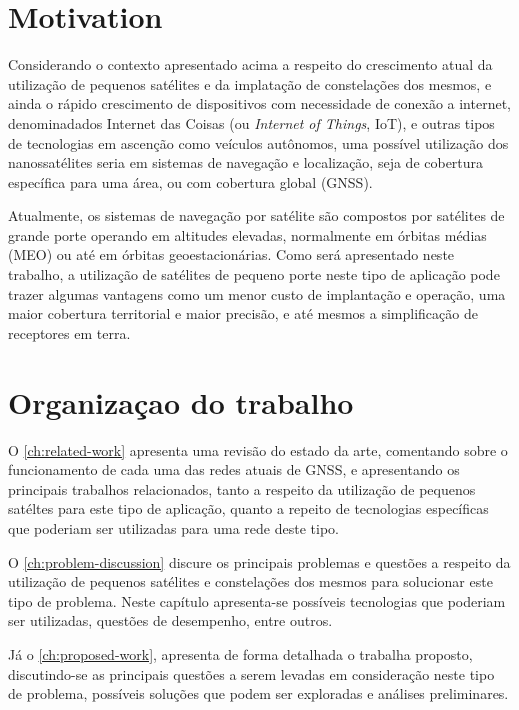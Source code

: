 \section{Motivation}

Considerando o contexto apresentado acima a respeito do crescimento atual da utilização de pequenos satélites e da implatação de constelações dos mesmos, e ainda o rápido crescimento de dispositivos com necessidade de conexão a internet, denominadados Internet das Coisas (ou \textit{Internet of Things}, IoT), e outras tipos de tecnologias em ascenção como veículos autônomos, uma possível utilização dos nanossatélites seria em sistemas de navegação e localização, seja de cobertura específica para uma área, ou com cobertura global (GNSS).

Atualmente, os sistemas de navegação por satélite são compostos por satélites de grande porte operando em altitudes elevadas, normalmente em órbitas médias (MEO) ou até em órbitas geoestacionárias. Como será apresentado neste trabalho, a utilização de satélites de pequeno porte neste tipo de aplicação pode trazer algumas vantagens como um menor custo de implantação e operação, uma maior cobertura territorial e maior precisão, e até mesmos a simplificação de receptores em terra.

\section{Organizaçao do trabalho}

O \autoref{ch:related-work} apresenta uma revisão do estado da arte, comentando sobre o funcionamento de cada uma das redes atuais de GNSS, e apresentando os principais trabalhos relacionados, tanto a respeito da utilização de pequenos satéltes para este tipo de aplicação, quanto a repeito de tecnologias específicas que poderiam ser utilizadas para uma rede deste tipo.

O \autoref{ch:problem-discussion} discure os principais problemas e questões a respeito da utilização de pequenos satélites e constelações dos mesmos para solucionar este tipo de problema. Neste capítulo apresenta-se possíveis tecnologias que poderiam ser utilizadas, questões de desempenho, entre outros.

Já o \autoref{ch:proposed-work}, apresenta de forma detalhada o trabalha proposto, discutindo-se as principais questões a serem levadas em consideração neste tipo de problema, possíveis soluções que podem ser exploradas e análises preliminares.

